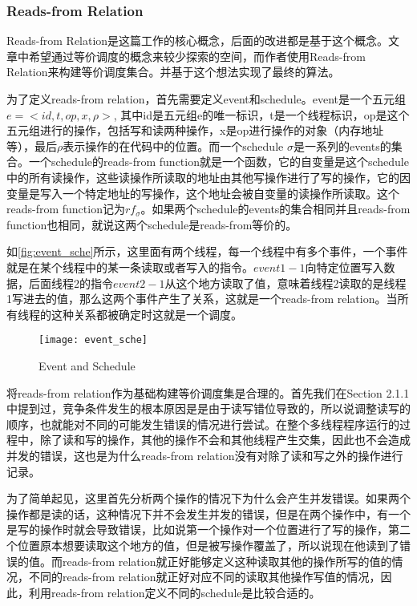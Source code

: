 \subsubsection{Reads-from Relation}

Reads-from Relation是这篇工作的核心概念，后面的改进都是基于这个概念。文章中希望通过等价调度的概念来较少探索的空间，而作者使用Reads-from Relation来构建等价调度集合。并基于这个想法实现了最终的算法。

为了定义reads-from relation，首先需要定义event和schedule。event是一个五元组$e = <id, t, op, x, \rho>$, 其中id是五元组e的唯一标识，t是一个线程标识，op是这个五元组进行的操作，包括写和读两种操作，x是op进行操作的对象（内存地址等），最后$\rho$表示操作的在代码中的位置。而一个schedule $\sigma$是一系列的events的集合。一个schedule的reads-from function就是一个函数，它的自变量是这个schedule中的所有读操作，这些读操作所读取的地址由其他写操作进行了写的操作，它的因变量是写入一个特定地址的写操作，这个地址会被自变量的读操作所读取。这个reads-from function记为$rf_{\sigma}$。如果两个schedule的events的集合相同并且reads-from function也相同，就说这两个schedule是reads-from等价的。

如\autoref{fig:event_sche}所示，这里面有两个线程，每一个线程中有多个事件，一个事件就是在某个线程中的某一条读取或者写入的指令。$event1-1$向特定位置写入数据，后面线程2的指令$event2-1$从这个地方读取了值，意味着线程2读取的是线程1写进去的值，那么这两个事件产生了关系，这就是一个reads-from relation。当所有线程的这种关系都被确定时这就是一个调度。

\begin{figure}[ht]
    \centering
    \texttt{[image: event\_sche]}
    \caption{\label{fig:event_sche}Event and Schedule}
\end{figure}

将reads-from relation作为基础构建等价调度集是合理的。首先我们在Section 2.1.1中提到过，竞争条件发生的根本原因是是由于读写错位导致的，所以说调整读写的顺序，也就能对不同的可能发生错误的情况进行尝试。在整个多线程程序运行的过程中，除了读和写的操作，其他的操作不会和其他线程产生交集，因此也不会造成并发的错误，这也是为什么reads-from relation没有对除了读和写之外的操作进行记录。

为了简单起见，这里首先分析两个操作的情况下为什么会产生并发错误。如果两个操作都是读的话，这种情况下并不会发生并发的错误，但是在两个操作中，有一个是写的操作时就会导致错误，比如说第一个操作对一个位置进行了写的操作，第二个位置原本想要读取这个地方的值，但是被写操作覆盖了，所以说现在他读到了错误的值。而reads-from relation就正好能够定义这种读取其他的操作所写的值的情况，不同的reads-from relation就正好对应不同的读取其他操作写值的情况，因此，利用reads-from relation定义不同的schedule是比较合适的。

